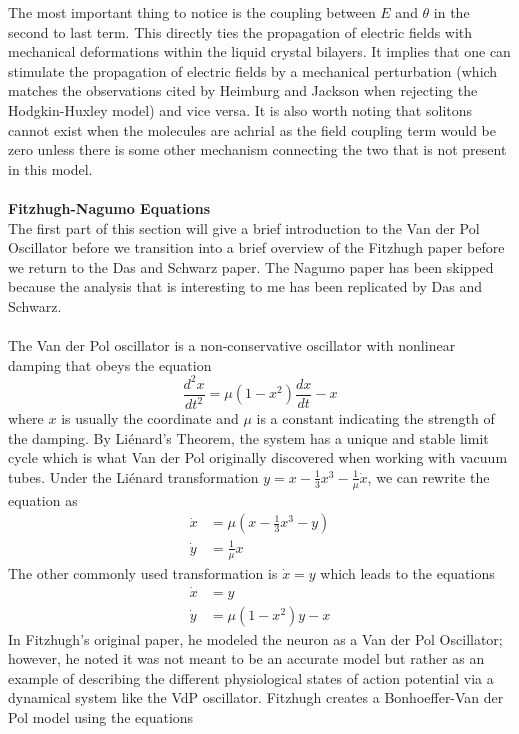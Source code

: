 \documentclass{article}
\newcommand{\od}[2]{\frac{d #1}{d #2}}
\newcommand{\odt}[2]{\frac{d^2 #1}{d #2 ^2}}
\numberwithin{equation}{section}
\begin{document}
The most important thing to notice is the coupling between $E$ and $\theta$ in the second to last term. This directly ties the propagation of electric fields with mechanical deformations within the liquid crystal bilayers. It implies that one can stimulate the propagation of electric fields by a mechanical perturbation (which matches the observations cited by Heimburg and Jackson when rejecting the Hodgkin-Huxley model) and vice versa. It is also worth noting that solitons cannot exist when the molecules are achrial as the field coupling term would be zero unless there is some other mechanism connecting the two that is not present in this model. \\\\
\textbf{Fitzhugh-Nagumo Equations}\\
The first part of this section will give a brief introduction to the Van der Pol Oscillator before we transition into a brief overview of the Fitzhugh paper before we return to the Das and Schwarz paper. The Nagumo paper has been skipped because the analysis that is interesting to me has been replicated by Das and Schwarz. \\\\
The Van der Pol oscillator is a non-conservative oscillator with nonlinear damping that obeys the equation 
\begin{equation}
    \odt{x}{t} = \mu(1-x^2) \od{x}{t} -x
\end{equation}
where $x$ is usually the coordinate and $\mu$ is a constant indicating the strength of the damping. By Li\'{e}nard's Theorem, the system has a unique and stable limit cycle which is what Van der Pol originally discovered when working with vacuum tubes. Under the Li\'{e}nard transformation $y=x-\tfrac{1}{3}x^3 - \tfrac{1}{\mu}\dot{x}$, we can rewrite the equation as 
\begin{equation}
\begin{split}
    \dot{x} &= \mu(x-\frac{1}{3}x^3-y) \\
    \dot{y} &= \frac{1}{\mu}x
\end{split}
\end{equation}
The other commonly used transformation is $\dot{x} = y$ which leads to the equations 
\begin{equation}
\begin{split}
    \dot{x}& = y\\
    \dot{y} &= \mu(1-x^2)y-x
\end{split}
\end{equation}
In Fitzhugh's original paper, he modeled the neuron as a Van der Pol Oscillator; however, he noted it was not meant to be an accurate model but rather as an example of describing the different physiological states of action potential via a dynamical system like the VdP oscillator. Fitzhugh creates a Bonhoeffer-Van der Pol model using the equations 
\end{document}
